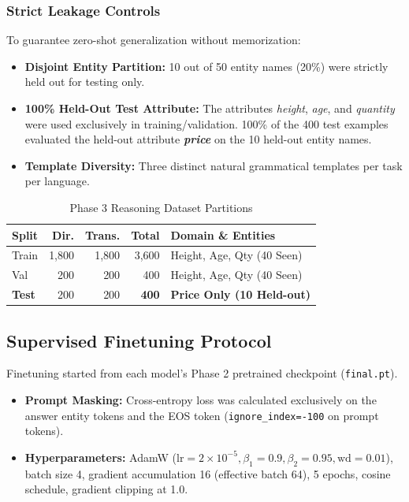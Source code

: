 \documentclass[10pt,a4paper]{article}
\begin{document}
\subsubsection{Strict Leakage Controls}
To guarantee zero-shot generalization without memorization:
\begin{itemize}[noitemsep,leftmargin=*]
    \item \textbf{Disjoint Entity Partition:} 10 out of 50 entity names (20\%) were strictly held out for testing only.
    \item \textbf{100\% Held-Out Test Attribute:} The attributes \textit{height}, \textit{age}, and \textit{quantity} were used exclusively in training/validation. 100\% of the 400 test examples evaluated the held-out attribute \textbf{\textit{price}} on the 10 held-out entity names.
    \item \textbf{Template Diversity:} Three distinct natural grammatical templates per task per language.
\end{itemize}

\begin{table}[t]
\centering
\footnotesize
\setlength{\tabcolsep}{2.0pt}
\caption{Phase 3 Reasoning Dataset Partitions}
\label{tab:reasoning_splits}
\begin{tabularx}{\columnwidth}{@{}>{\raggedright\arraybackslash}lrrr>{\raggedright\arraybackslash}X@{}}
\toprule
\textbf{Split} & \textbf{Dir.} & \textbf{Trans.} & \textbf{Total} & \textbf{Domain \& Entities} \\
\midrule
Train & 1,800 & 1,800 & 3,600 & Height, Age, Qty (40 Seen) \\
Val & 200 & 200 & 400 & Height, Age, Qty (40 Seen) \\
\textbf{Test} & 200 & 200 & \textbf{400} & \textbf{Price Only (10 Held-out)} \\
\bottomrule
\end{tabularx}
\end{table}

\subsection{Supervised Finetuning Protocol}
Finetuning started from each model's Phase 2 pretrained checkpoint (\texttt{final.pt}).
\begin{itemize}[noitemsep,leftmargin=*]
    \item \textbf{Prompt Masking:} Cross-entropy loss was calculated exclusively on the answer entity tokens and the EOS token (\texttt{ignore\_index=-100} on prompt tokens).
    \item \textbf{Hyperparameters:} AdamW ($\text{lr}=2\times 10^{-5}, \beta_1=0.9, \beta_2=0.95, \text{wd}=0.01$), batch size 4, gradient accumulation 16 (effective batch 64), 5 epochs, cosine schedule, gradient clipping at 1.0.
\end{itemize}
\end{document}
